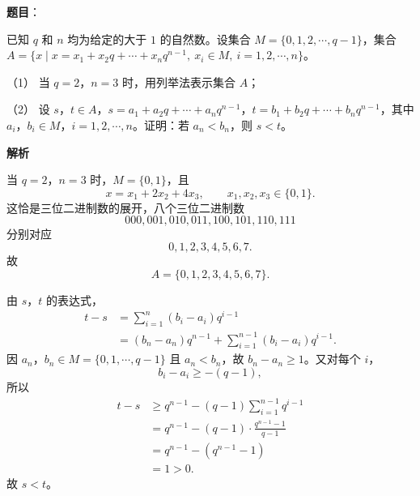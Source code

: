 \begin{answer}

\textbf{题目}：

已知 $q$ 和 $n$ 均为给定的大于 $1$ 的自然数。设集合 $M=\{0,1,2,\cdots,q-1\}$，集合 $A=\{x\mid x=x_1+x_2q+\cdots+x_nq^{n-1},\ x_i\in M,\ i=1,2,\cdots,n\}$。

（1） 当 $q=2$，$n=3$ 时，用列举法表示集合 $A$；

（2） 设 $s$，$t\in A$，$s=a_1+a_2q+\cdots+a_nq^{n-1}$，$t=b_1+b_2q+\cdots+b_nq^{n-1}$，其中 $a_i$，$b_i\in M$，$i=1,2,\cdots,n$。证明：若 $a_n<b_n$，则 $s<t$。

\textbf{解析}


当 $q=2$，$n=3$ 时，$M=\{0,1\}$，且
\nopagebreak[4]
\[x=x_1+2x_2+4x_3,\qquad x_1,x_2,x_3\in\{0,1\}.\]
这恰是三位二进制数的展开，八个三位二进制数
\nopagebreak[4]
\[000,001,010,011,100,101,110,111\]
分别对应
\nopagebreak[4]
\[0,1,2,3,4,5,6,7.\]
故
\nopagebreak[4]
\[A=\{0,1,2,3,4,5,6,7\}.\]


由 $s$，$t$ 的表达式，
\nopagebreak[4]
\[\begin{aligned}
t-s&=\sum_{i=1}^{n}(b_i-a_i)q^{i-1}\\
&=(b_n-a_n)q^{n-1}+\sum_{i=1}^{n-1}(b_i-a_i)q^{i-1}.
\end{aligned}\]
因 $a_n$，$b_n\in M=\{0,1,\cdots,q-1\}$ 且 $a_n<b_n$，故 $b_n-a_n\geqslant1$。又对每个 $i$，
\nopagebreak[4]
\[b_i-a_i\geqslant-(q-1),\]
所以
\nopagebreak[4]
\[\begin{aligned}
t-s&\geqslant q^{n-1}-(q-1)\sum_{i=1}^{n-1}q^{i-1}\\
&=q^{n-1}-(q-1)\cdot\frac{q^{n-1}-1}{q-1}\\
&=q^{n-1}-(q^{n-1}-1)\\
&=1>0.
\end{aligned}\]
故 $s<t$。



\end{answer}

